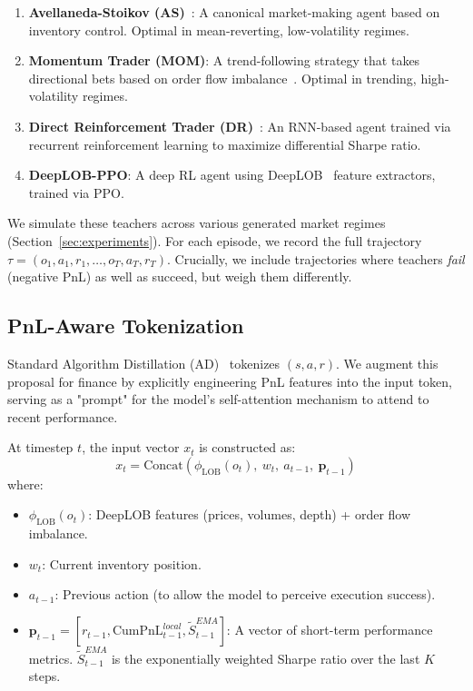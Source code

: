 \documentclass{article}
\begin{document}
\begin{enumerate}
    \item \textbf{Avellaneda-Stoikov (AS)}~\citep{avellaneda2008high}: A canonical market-making agent based on inventory control. Optimal in mean-reverting, low-volatility regimes.
    \item \textbf{Momentum Trader (MOM)}: A trend-following strategy that takes directional bets based on order flow imbalance~\citep{cartea2015algorithmic}. Optimal in trending, high-volatility regimes.
    \item \textbf{Direct Reinforcement Trader (DR)}~\citep{moody2001direct}: An RNN-based agent trained via recurrent reinforcement learning to maximize differential Sharpe ratio.
    \item \textbf{DeepLOB-PPO}: A deep RL agent using DeepLOB~\citep{zhang2019deeplob} feature extractors, trained via PPO.
\end{enumerate}

We simulate these teachers across various generated market regimes (Section~\ref{sec:experiments}). For each episode, we record the full trajectory $\tau = (o_1, a_1, r_1, \dots, o_T, a_T, r_T)$. Crucially, we include trajectories where teachers \emph{fail} (negative PnL) as well as succeed, but weigh them differently.

\subsection{PnL-Aware Tokenization}
Standard Algorithm Distillation (AD)~\citep{laskin2023context} tokenizes $(s, a, r)$. We augment this proposal for finance by explicitly engineering PnL features into the input token, serving as a "prompt" for the model's self-attention mechanism to attend to recent performance.

At timestep $t$, the input vector $x_t$ is constructed as:
\begin{equation}
    x_t = \text{Concat}\left( \phi_{\text{LOB}}(o_t), \ w_t, \ a_{t-1}, \ \mathbf{p}_{t-1} \right)
\end{equation}
where:
\begin{itemize}
    \item $\phi_{\text{LOB}}(o_t)$: DeepLOB features (prices, volumes, depth) + order flow imbalance.
    \item $w_t$: Current inventory position.
    \item $a_{t-1}$: Previous action (to allow the model to perceive execution success).
    \item $\mathbf{p}_{t-1} = [r_{t-1}, \text{CumPnL}_{t-1}^{local}, \tilde{S}_{t-1}^{EMA}]$: A vector of short-term performance metrics. $\tilde{S}_{t-1}^{EMA}$ is the exponentially weighted Sharpe ratio over the last $K$ steps.
\end{itemize}
\end{document}
